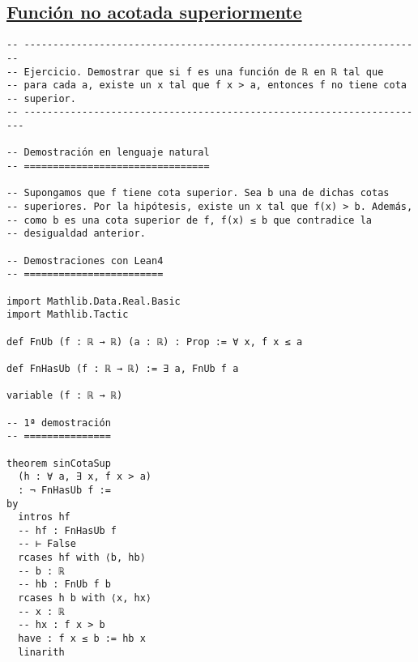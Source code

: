 \subsection{\href{./src/Logica/Funcion\_no\_acotada\_superiormente.lean}{Función no acotada superiormente}}
\label{sec:org9ad08fe}
\begin{verbatim}
-- ---------------------------------------------------------------------
-- Ejercicio. Demostrar que si f es una función de ℝ en ℝ tal que
-- para cada a, existe un x tal que f x > a, entonces f no tiene cota
-- superior.
-- ----------------------------------------------------------------------

-- Demostración en lenguaje natural
-- ================================

-- Supongamos que f tiene cota superior. Sea b una de dichas cotas
-- superiores. Por la hipótesis, existe un x tal que f(x) > b. Además,
-- como b es una cota superior de f, f(x) ≤ b que contradice la
-- desigualdad anterior.

-- Demostraciones con Lean4
-- ========================

import Mathlib.Data.Real.Basic
import Mathlib.Tactic

def FnUb (f : ℝ → ℝ) (a : ℝ) : Prop := ∀ x, f x ≤ a

def FnHasUb (f : ℝ → ℝ) := ∃ a, FnUb f a

variable (f : ℝ → ℝ)

-- 1ª demostración
-- ===============

theorem sinCotaSup
  (h : ∀ a, ∃ x, f x > a)
  : ¬ FnHasUb f :=
by
  intros hf
  -- hf : FnHasUb f
  -- ⊢ False
  rcases hf with ⟨b, hb⟩
  -- b : ℝ
  -- hb : FnUb f b
  rcases h b with ⟨x, hx⟩
  -- x : ℝ
  -- hx : f x > b
  have : f x ≤ b := hb x
  linarith
\end{verbatim}


